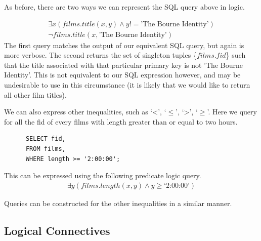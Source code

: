 \documentclass[a4paper, 11pt]{article}
\begin{document}
      As before, there are two ways we can represent the SQL query above in
      logic.

      \begin{gather}
        \exists x(films.title(x, y) \land y !=  \text{'The Bourne
        Identity'})\label{where3}\\
        \lnot films.title(x, \text{'The Bourne Identity'})\label{where4}
      \end{gather}
      The first query matches the output of our equivalent SQL query, but again
      is more verbose. The second returns the set of singleton tuples
      \{$films.fid$\} such that the title associated with that particular
      primary key is not 'The Bourne Identity'. This is not equivalent to our
      SQL expression however, and may be undesirable to use in this
      circumstance (it is likely that we would like to return all other film
      titles).

      We can also express other inequalities, such as `<', `$\le$', `>', `$\ge$'.
      Here we query for all the fid of every films with length greater than or
      equal to two hours.
      \begin{verbatim}
      SELECT fid,
      FROM films,
      WHERE length >= '2:00:00';
      \end{verbatim}
      This can be expressed using the following predicate logic query.
      \begin{gather}
        \exists y(films.length(x, y) \land y \ge \text{`2:00:00'}) \label{where5}
      \end{gather}

      Queries can be constructed for the other inequalities in a
      similar manner.

    \subsection{Logical Connectives}
\end{document}
